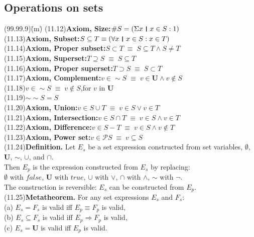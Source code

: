 \documentclass{amsart}
\newcommand{\lgap}{2pt}                             %
\newcommand{\equivs}{\ensuremath{\;\equiv\;}}       %
\newcommand{\impl}{\ensuremath{\Rightarrow}}        %
\newcommand{\thedr}{\rule[-.25ex]{.32mm}{1.75ex}}   %
\newcommand{\dr}{\;\,\thedr\,\;}                    %
\newcommand{\rb}{:}                                 %
\newcommand{\all}{\forall}                          %
\begin{document}
\subsection*{Operations on sets}
\begin{tabbing}
(99.99.9)\;\=(m)\;\=\kill
(11.12)\>\textbf{Axiom, Size:}\quad $\#S = (\Sigma x\dr x\in S\rb 1)$\\[\lgap]
(11.13)\>\textbf{Axiom, Subset:}\quad $S\subseteq T \equiv (\all x\dr x\in S\rb x\in T)$\\[\lgap]
(11.14)\>\textbf{Axiom, Proper subset:}\quad $S\subset T \equivs S\subseteq T\land S\ne T$\\[\lgap]
(11.15)\>\textbf{Axiom, Superset:}\quad $T\supseteq S \equivs S\subseteq T$\\[\lgap]
(11.16)\>\textbf{Axiom, Proper superset:}\quad $T\supset S \equivs S\subset T$\\[\lgap]
(11.17)\>\textbf{Axiom, Complement:}\quad $v\in \sim S \equivs v\in \mathbf{U} \land v\notin S$\\[\lgap]
(11.18)\>$v\in \sim S \equivs v\notin S$,\quad for $v$ in $\mathbf{U}$\\[\lgap]
(11.19)\>$\sim \sim S = S$\\[\lgap]
(11.20)\>\textbf{Axiom, Union:}\quad $v\in S \cup T\equivs v\in S\lor v\in T$\\[\lgap]
(11.21)\>\textbf{Axiom, Intersection:}\quad $v\in S \cap T\equivs v\in S\land v\in T$\\[\lgap]
(11.22)\>\textbf{Axiom, Difference:}\quad $v\in S - T\equivs v\in S\land v\notin T$\\[\lgap]
(11.23)\>\textbf{Axiom, Power set:}\quad $v\in \mathcal{P}S\equivs v\subseteq S$\\[\lgap]
(11.24)\>\textbf{Definition. } Let $E_{s}$ be a set expression constructed from set variables, $\emptyset$, $\mathbf{U}$, $\sim$, $\cup$, and $\cap$.\\[\lgap]
       \>Then $E_{p}$ is the expression constructed from $E_{s}$ by replacing:\\[\lgap]
       \>$\emptyset$ with $false$, \quad $\mathbf{U}$ with $true$, \quad $\cup$ with $\lor$, \quad $\cap$ with $\land$, \quad $\sim$ with $\neg$.\\[\lgap]
       \>The construction is reversible: $E_{s}$ can be constructed from $E_{p}$.\\[\lgap]
(11.25)\>\textbf{Metatheorem. } For any set expressions $E_{s}$ and $F_{s}$:\\[\lgap]
       \>(a)\> $E_{s} = F_{s}$ is valid iff $E_{p} \equiv F_{p}$ is valid,\\[\lgap]
       \>(b)\> $E_{s} \subseteq F_{s}$ is valid iff $E_{p} \impl F_{p}$ is valid,\\[\lgap]
       \>(c)\> $E_{s} = \mathbf{U}$ is valid iff $E_{p}$ is valid.\\[\lgap]
\end{tabbing}
\end{document}
